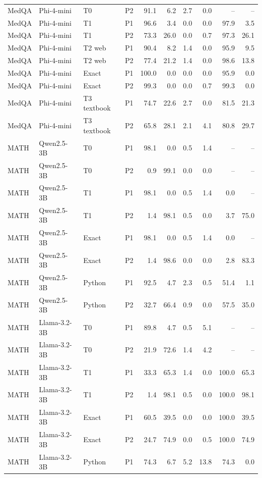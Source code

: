 \begin{tabular}{llll rrrr rr}
MedQA & Phi-4-mini & T0 & P2 & 91.1 & 6.2 & 2.7 & 0.0 & -- & --\\
MedQA & Phi-4-mini & T1 & P1 & 96.6 & 3.4 & 0.0 & 0.0 & 97.9 & 3.5\\
MedQA & Phi-4-mini & T1 & P2 & 73.3 & 26.0 & 0.0 & 0.7 & 97.3 & 26.1\\
MedQA & Phi-4-mini & T2 web & P1 & 90.4 & 8.2 & 1.4 & 0.0 & 95.9 & 9.5\\
MedQA & Phi-4-mini & T2 web & P2 & 77.4 & 21.2 & 1.4 & 0.0 & 98.6 & 13.8\\
MedQA & Phi-4-mini & Exact & P1 & 100.0 & 0.0 & 0.0 & 0.0 & 95.9 & 0.0\\
MedQA & Phi-4-mini & Exact & P2 & 99.3 & 0.0 & 0.0 & 0.7 & 99.3 & 0.0\\
MedQA & Phi-4-mini & T3 textbook & P1 & 74.7 & 22.6 & 2.7 & 0.0 & 81.5 & 21.3\\
MedQA & Phi-4-mini & T3 textbook & P2 & 65.8 & 28.1 & 2.1 & 4.1 & 80.8 & 29.7\\
\midrule
MATH & Qwen2.5-3B & T0 & P1 & 98.1 & 0.0 & 0.5 & 1.4 & -- & --\\
MATH & Qwen2.5-3B & T0 & P2 & 0.9 & 99.1 & 0.0 & 0.0 & -- & --\\
MATH & Qwen2.5-3B & T1 & P1 & 98.1 & 0.0 & 0.5 & 1.4 & 0.0 & --\\
MATH & Qwen2.5-3B & T1 & P2 & 1.4 & 98.1 & 0.5 & 0.0 & 3.7 & 75.0\\
MATH & Qwen2.5-3B & Exact & P1 & 98.1 & 0.0 & 0.5 & 1.4 & 0.0 & --\\
MATH & Qwen2.5-3B & Exact & P2 & 1.4 & 98.6 & 0.0 & 0.0 & 2.8 & 83.3\\
MATH & Qwen2.5-3B & Python & P1 & 92.5 & 4.7 & 2.3 & 0.5 & 51.4 & 1.1\\
MATH & Qwen2.5-3B & Python & P2 & 32.7 & 66.4 & 0.9 & 0.0 & 57.5 & 35.0\\
\midrule
MATH & Llama-3.2-3B & T0 & P1 & 89.8 & 4.7 & 0.5 & 5.1 & -- & --\\
MATH & Llama-3.2-3B & T0 & P2 & 21.9 & 72.6 & 1.4 & 4.2 & -- & --\\
MATH & Llama-3.2-3B & T1 & P1 & 33.3 & 65.3 & 1.4 & 0.0 & 100.0 & 65.3\\
MATH & Llama-3.2-3B & T1 & P2 & 1.4 & 98.1 & 0.5 & 0.0 & 100.0 & 98.1\\
MATH & Llama-3.2-3B & Exact & P1 & 60.5 & 39.5 & 0.0 & 0.0 & 100.0 & 39.5\\
MATH & Llama-3.2-3B & Exact & P2 & 24.7 & 74.9 & 0.0 & 0.5 & 100.0 & 74.9\\
MATH & Llama-3.2-3B & Python & P1 & 74.3 & 6.7 & 5.2 & 13.8 & 74.3 & 0.0\\

\end{tabular}
